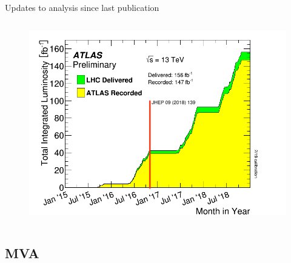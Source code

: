 \documentclass[aspectratio=169,xcolor=table]{beamer}
\begin{document}
\begin{frame}[t]{Updates to analysis since last publication}
\begin{columns}
      \begin{figure}
      \includegraphics[width=1.1\textwidth,keepaspectratio=true]{intlumivstimeRun2.png}
      \caption{\tiny \cite{luminositypublicresultsrun2}}
      \end{figure}
      \end{columns}
    \end{frame}

  \subsection{ MVA }
\end{document}
